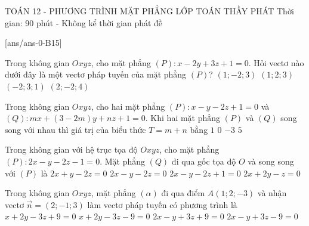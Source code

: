 \begin{name}
	{\tenchude}
	{TOÁN 12 - PHƯƠNG TRÌNH MẶT PHẲNG}
	{LỚP TOÁN THẦY PHÁT}
	{Thời gian: 90 phút - Không kể thời gian phát đề}
\end{name}
[ans/ans-0-B15]
\caulc
\begin{ex}%
	Trong không gian $Oxyz$, cho mặt phẳng $(P)\colon x-2 y+3 z+1=0$. Hỏi vectơ nào dưới đây là một vectơ pháp tuyến của mặt phẳng $(P)$?
	\choice
	{\True $(1;-2; 3)$}
	{$(1; 2; 3)$}
	{$(-2; 3; 1)$}
	{$(2;-2; 4)$}
\end{ex}
\begin{ex}%
	Trong không gian $Oxyz$, cho hai mặt phẳng $(P)\colon x-y-2z+1=0$ và $(Q)\colon mx+(3-2m)y+nz+1=0$. Khi hai mặt phẳng $(P)$ và $(Q)$ song song với nhau thì giá trị của biểu thức $T=m+n$ bằng
	\choice
	{$1$}
	{$0$}
	{\True $-3$}
	{$5$}
\end{ex}

\begin{ex}%
	Trong không gian với hệ trục tọa độ $Oxyz$, cho mặt phẳng $(P)\colon 2x-y-2z-1=0$. Mặt phẳng $(Q)$ đi qua gốc tọa độ $O$ và song song với $(P)$ là
	\choice
	{$2x+y-2z=0$}
	{\True $2x-y-2z=0$}
	{$2x-y-2z+1=0$}
	{$2x+2y-z=0$}
\end{ex}


\begin{ex}%
	Trong không gian $Oxyz$, mặt phẳng $(\alpha)$ đi qua điểm $A(1;2;-3)$ và nhận vectơ $\overrightarrow{n}=(2;-1;3)$ làm vectơ pháp tuyến có phương trình là
	\choice
	{$x+2y-3z+9=0$}
	{$x+2y-3z-9=0$}
	{\True $2x-y+3z+9=0$}
	{$2x-y+3z-9=0$}
\end{ex}

